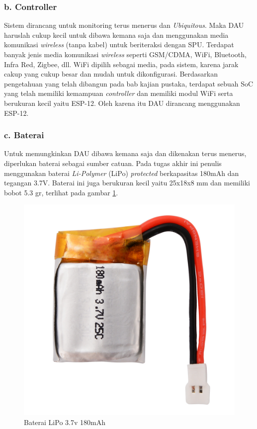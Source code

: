 \subsubsection{b. Controller}
Sistem dirancang untuk monitoring terus menerus dan \textit{Ubiquitous}. Maka DAU haruslah cukup kecil untuk dibawa kemana saja dan menggunakan media komunikasi \textit{wireless} (tanpa kabel) untuk beriteraksi dengan SPU. Terdapat banyak jenis media komunikasi \textit{wireless} seperti GSM/CDMA, WiFi, Bluetooth, Infra Red, Zigbee, dll. WiFi dipilih sebagai media, pada sistem, karena jarak cakup yang cukup besar dan mudah untuk dikonfigurasi. Berdasarkan pengetahuan yang telah dibangun pada bab kajian pustaka, terdapat sebuah SoC yang telah memiliki kemampuan \textit{controller} dan memiliki modul WiFi serta berukuran kecil yaitu ESP-12. Oleh karena itu DAU dirancang menggunakan ESP-12.

\subsubsection{c. Baterai}
Untuk memungkinkan DAU dibawa kemana saja dan dikenakan terus menerus, diperlukan baterai sebagai sumber catuan. Pada tugas akhir ini penulis menggunakan baterai \textit{Li-Polymer} (LiPo) \textit{protected} berkapasitas 180mAh dan tegangan 3.7V. Baterai ini juga berukuran kecil yaitu 25x18x8 mm dan memiliki bobot 5.3 gr, terlihat pada gambar \ref{fig:battery}.

\begin{figure}[H]
	\centering
	\includegraphics[scale=0.14]{images/baterai.jpg}
	\caption{Baterai LiPo 3.7v 180mAh}
	\label{fig:battery}
\end{figure}

